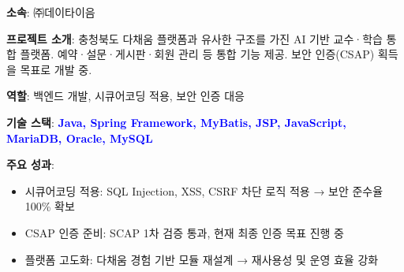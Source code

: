 \documentclass[a4paper,11pt]{article}
\newcommand{\tech}[1]{\textbf{\textcolor{blue}{#1}}}
\begin{document}
\textbf{소속}: ㈜데이타이음

\textbf{프로젝트 소개}:  
충청북도 다채움 플랫폼과 유사한 구조를 가진 AI 기반 교수·학습 통합 플랫폼.  
예약·설문·게시판·회원 관리 등 통합 기능 제공.  
보안 인증(CSAP) 획득을 목표로 개발 중.

\textbf{역할}: 백엔드 개발, 시큐어코딩 적용, 보안 인증 대응 

\textbf{기술 스택}: \tech{Java, Spring Framework, MyBatis, JSP, JavaScript, MariaDB, Oracle, MySQL}

\textbf{주요 성과}:
\begin{itemize}[leftmargin=*]
  \item 시큐어코딩 적용: SQL Injection, XSS, CSRF 차단 로직 적용 → 보안 준수율 100\% 확보
  \item CSAP 인증 준비: SCAP 1차 검증 통과, 현재 최종 인증 목표 진행 중
  \item 플랫폼 고도화: 다채움 경험 기반 모듈 재설계 → 재사용성 및 운영 효율 강화
\end{itemize}
\end{document}
